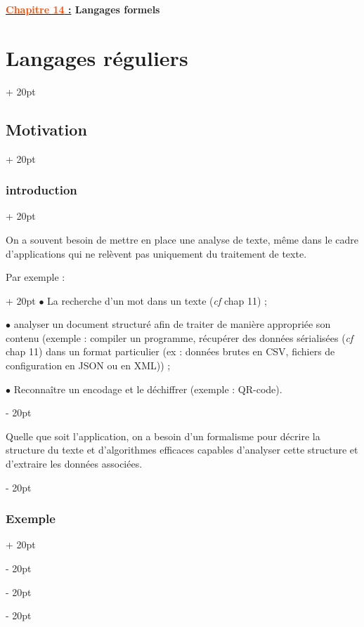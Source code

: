 \documentclass[a4paper, 12pt, twoside]{article}
\newcommand{\Emph}{\textcolor{ff4500}}
\newcommand{\ind}[1][20pt]{\advance\leftskip + #1}
\newcommand{\deind}[1][20pt]{\advance\leftskip - #1}
\newenvironment{indt}[2][20pt]{#2 \par \ind[#1]}{\par \deind} %
\newcommand{\thetitle}[2]{\begin{center}\textbf{{\LARGE \underline{\Emph{#1} :}} {\Large #2}}\end{center}}
\begin{document}
    
    \thetitle{Chapitre 14}{Langages formels}
    
    \tableofcontents
    \newpage
    
    \begin{indt}{\section{Langages réguliers}}
        \begin{indt}{\subsection{Motivation}}
            \begin{indt}{\subsubsection{introduction}}
                \label{1.1.1}

                On a souvent besoin de mettre en place une analyse de texte, même dans le cadre d'applications qui ne relèvent pas uniquement du traitement de texte.

                \begin{indt}{Par exemple :}
                    $\bullet$ La recherche d'un mot dans un texte (\textit{cf} chap 11) ;

                    $\bullet$ analyser un document structuré afin de traiter de manière appropriée son contenu (exemple : compiler un programme, récupérer des données sérialisées (\textit{cf} chap 11) dans un format particulier (ex : données brutes en CSV, fichiers de configuration en JSON ou en XML)) ;

                    $\bullet$ Reconnaître un encodage et le déchiffrer (exemple : QR-code).
                \end{indt}

                \vspace{12pt}
                
                Quelle que soit l'application, on a besoin d'un formalisme pour décrire la structure du texte et d'algorithmes efficaces capables d'analyser cette structure et d'extraire les données associées.
            \end{indt}

            \vspace{12pt}
            
            \begin{indt}{\subsubsection{Exemple}}
                \label{1.1.2}


\end{indt}
\end{indt}
\end{indt}
\end{document}
